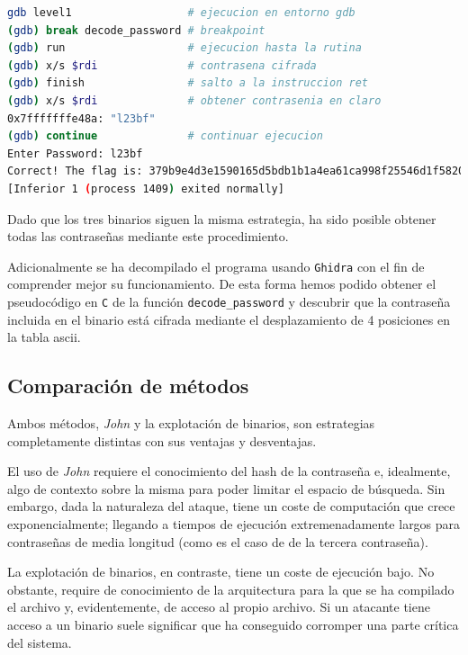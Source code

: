 \documentclass[]{article}
\begin{document}
\lstset{style=bash}
\begin{center}
    \begin{lstlisting}[language=bash,caption=Obtención de contraseña para level1 en gdb]
gdb level1                  # ejecucion en entorno gdb
(gdb) break decode_password # breakpoint
(gdb) run                   # ejecucion hasta la rutina
(gdb) x/s $rdi              # contrasena cifrada
(gdb) finish                # salto a la instruccion ret
(gdb) x/s $rdi              # obtener contrasenia en claro
0x7fffffffe48a:	"l23bf"
(gdb) continue              # continuar ejecucion
Enter Password: l23bf
Correct! The flag is: 379b9e4d3e1590165d5bdb1b1a4ea61ca998f25546d1f5820394e98971098d84
[Inferior 1 (process 1409) exited normally]
\end{lstlisting}
\end{center}

Dado que los tres binarios siguen la misma estrategia, ha sido posible obtener todas las contraseñas mediante este procedimiento.

Adicionalmente se ha decompilado el programa usando \texttt{Ghidra} con el fin de comprender mejor su funcionamiento. De esta forma hemos podido obtener el pseudocódigo en \texttt{C} de la función \texttt{decode\_password} y descubrir que la contraseña incluida en el binario está cifrada mediante el desplazamiento de 4 posiciones en la tabla ascii.

\subsection{Comparación de métodos}
\label{subsec:comparacion}
Ambos métodos, \textit{John} y la explotación de binarios, son estrategias completamente distintas con sus ventajas y desventajas.

El uso de \textit{John} requiere el conocimiento del hash de la contraseña e, idealmente, algo de contexto sobre la misma para poder limitar el espacio de búsqueda. Sin embargo, dada la naturaleza del ataque, tiene un coste de computación que crece exponencialmente; llegando a tiempos de ejecución extremenadamente largos para contraseñas de media longitud (como es el caso de de la tercera contraseña).

La explotación de binarios, en contraste, tiene un coste de ejecución bajo. No obstante, require de conocimiento de la arquitectura para la que se ha compilado el archivo y, evidentemente, de acceso al propio archivo. Si un atacante tiene acceso a un binario suele significar que ha conseguido corromper una parte crítica del sistema.
\end{document}
